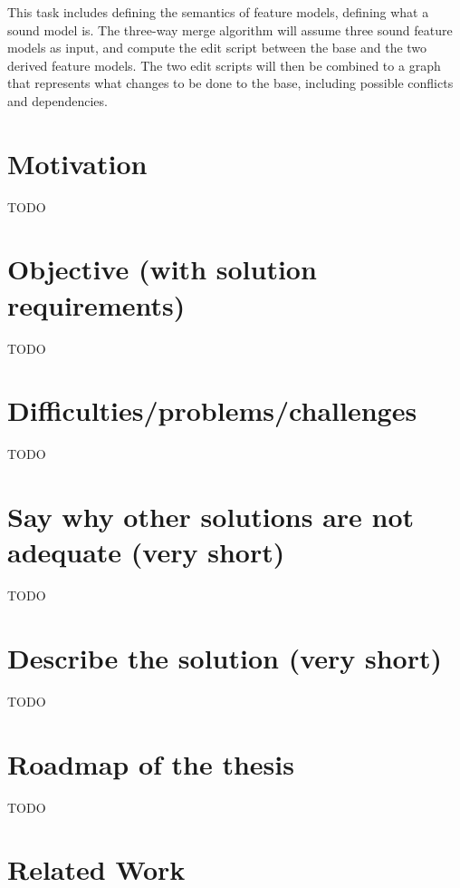 \documentclass[a4paper,english]{ifimaster}
\begin{document}
This task includes defining the semantics of feature models, defining what a sound model is. The three-way merge algorithm will assume three sound feature models as input, and compute the edit script between the base and the two derived feature models. The two edit scripts will then be combined to a graph that represents what changes to be done to the base, including possible conflicts and dependencies.


\section{Motivation}%
\label{sec:motivation}

TODO

\section{Objective (with solution requirements)}%
\label{sec:objective_with_solution_requirements_}

TODO

\section{Difficulties/problems/challenges}%
\label{sec:difficulties_problems_challenges}

TODO

\section{Say why other solutions are not adequate (very short)}%
\label{sec:say_why_other_solutions_are_not_adequate_very_short_}

TODO

\section{Describe the solution (very short)}%
\label{sec:describe_the_solution_very_short_}

TODO

\section{Roadmap of the thesis}%
\label{sec:roadmap_of_the_thesis}

TODO

\section{Related Work}%
\label{sec:related_work}
\end{document}
